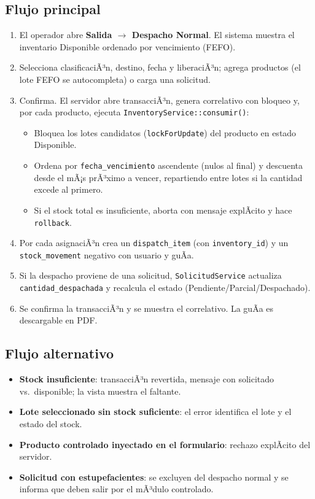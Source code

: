 ﻿\documentclass[a4paper, 12pt]{article}
\begin{document}
\subsection{Flujo principal}
\begin{enumerate}
    \item El operador abre \textbf{Salida $\to$ Despacho Normal}. El sistema muestra el inventario Disponible ordenado por vencimiento (FEFO).
    \item Selecciona clasificaciÃ³n, destino, fecha y liberaciÃ³n; agrega productos (el lote FEFO se autocompleta) o carga una solicitud.
    \item Confirma. El servidor abre transacciÃ³n, genera correlativo con bloqueo y, por cada producto, ejecuta \texttt{InventoryService::consumir()}:
    \begin{itemize}
        \item Bloquea los lotes candidatos (\texttt{lockForUpdate}) del producto en estado Disponible.
        \item Ordena por \texttt{fecha\_vencimiento} ascendente (nulos al final) y descuenta desde el mÃ¡s prÃ³ximo a vencer, repartiendo entre lotes si la cantidad excede al primero.
        \item Si el stock total es insuficiente, aborta con mensaje explÃ­cito y hace \texttt{rollback}.
    \end{itemize}
    \item Por cada asignaciÃ³n crea un \texttt{dispatch\_item} (con \texttt{inventory\_id}) y un \texttt{stock\_movement} negativo con usuario y guÃ­a.
    \item Si la despacho proviene de una solicitud, \texttt{SolicitudService} actualiza \texttt{cantidad\_despachada} y recalcula el estado (Pendiente/Parcial/Despachado).
    \item Se confirma la transacciÃ³n y se muestra el correlativo. La guÃ­a es descargable en PDF.
\end{enumerate}

\subsection{Flujo alternativo}
\begin{itemize}
    \item \textbf{Stock insuficiente}: transacciÃ³n revertida, mensaje con solicitado vs.\ disponible; la vista muestra el faltante.
    \item \textbf{Lote seleccionado sin stock suficiente}: el error identifica el lote y el estado del stock.
    \item \textbf{Producto controlado inyectado en el formulario}: rechazo explÃ­cito del servidor.
    \item \textbf{Solicitud con estupefacientes}: se excluyen del despacho normal y se informa que deben salir por el mÃ³dulo controlado.
\end{itemize}
\end{document}
